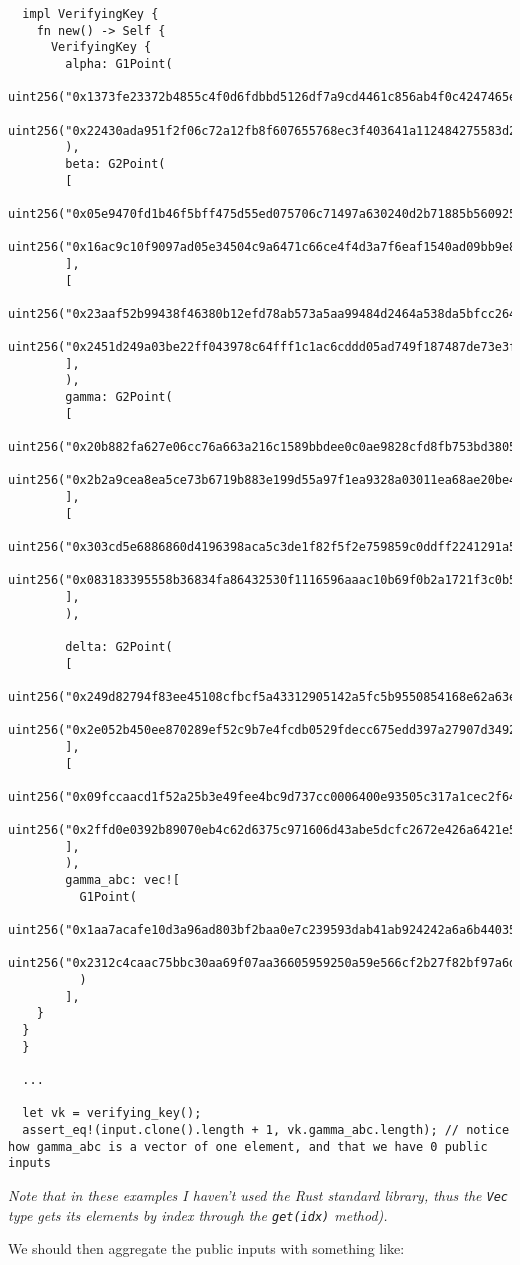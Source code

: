 \documentclass{article}
\begin{document}
\begin{lstlisting}
  impl VerifyingKey {
    fn new() -> Self {
      VerifyingKey {
        alpha: G1Point(
        uint256("0x1373fe23372b4855c4f0d6fdbbd5126df7a9cd4461c856ab4f0c4247465e5408"),
        uint256("0x22430ada951f2f06c72a12fb8f607655768ec3f403641a112484275583d249ef"),
        ),
        beta: G2Point(
        [
          uint256("0x05e9470fd1b46f5bff475d55ed075706c71497a630240d2b71885b560925e111"),
          uint256("0x16ac9c10f9097ad05e34504c9a6471c66ce4f4d3a7f6eaf1540ad09bb9e8b08f"),
        ],
        [
          uint256("0x23aaf52b99438f46380b12efd78ab573a5aa99484d2464a538da5bfcc2642f8d"),
          uint256("0x2451d249a03be22ff043978c64fff1c1ac6cddd05ad749f187487de73e3fe749"),
        ],
        ),
        gamma: G2Point(
        [
          uint256("0x20b882fa627e06cc76a663a216c1589bbdee0c0ae9828cfd8fb753bd3805d472"),
          uint256("0x2b2a9cea8ea5ce73b6719b883e199d55a97f1ea9328a03011ea68ae20be43d17"),
        ],
        [
          uint256("0x303cd5e6886860d4196398aca5c3de1f82f5f2e759859c0ddff2241291a54422"),
          uint256("0x083183395558b36834fa86432530f1116596aaac10b69f0b2a1721f3c0b59030"),
        ],
        ),

        delta: G2Point(
        [
          uint256("0x249d82794f83ee45108cfbcf5a43312905142a5fc5b9550854168e62a63e2849"),
          uint256("0x2e052b450ee870289ef52c9b7e4fcdb0529fdecc675edd397a27907d34928b60"),
        ],
        [
          uint256("0x09fccaacd1f52a25b3e49fee4bc9d737cc0006400e93505c317a1cec2f64b346"),
          uint256("0x2ffd0e0392b89070eb4c62d6375c971606d43abe5dcfc2672e426a6421e5b1b3"),
        ],
        ),
        gamma_abc: vec![
          G1Point(
          uint256("0x1aa7acafe10d3a96ad803bf2baa0e7c239593dab41ab924242a6a6b44035e9ad"),
          uint256("0x2312c4caac75bbc30aa69f07aa36605959250a59e566cf2b27f82bf97a6d1703"),
          )
        ],
    }
  }
  }

  ...
  
  let vk = verifying_key();
  assert_eq!(input.clone().length + 1, vk.gamma_abc.length); // notice how gamma_abc is a vector of one element, and that we have 0 public inputs
\end{lstlisting}

\textit{Note that in these examples I haven't used the Rust standard library, thus the \texttt{Vec} type gets its elements by index through the \texttt{get(idx)} method).}

We should then aggregate the public inputs with something like:
\end{document}
